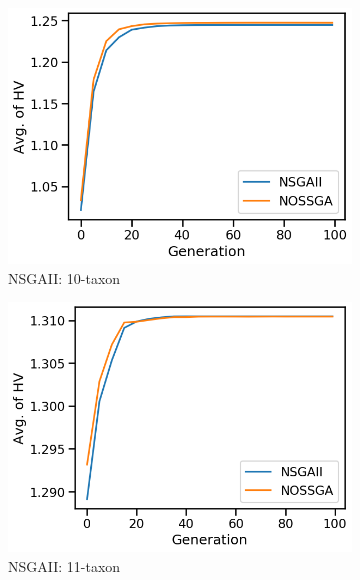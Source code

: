 \begin{figure}[!htbp]
	\centering
	\begin{adjustwidth}{-1cm}{-1cm}
		\begin{subfigure}[b]{0.4\textwidth}
			\includegraphics[width=\textwidth]{Figure/10-taxon_hv}
			\caption{NSGAII: 10-taxon}
		\end{subfigure}%
		\begin{subfigure}[b]{0.4\textwidth}
			\includegraphics[width=\textwidth]{Figure/11-taxon_hv}
			\caption{NSGAII: 11-taxon}
		\end{subfigure}%
		\begin{subfigure}[b]{0.4\textwidth}

\end{subfigure}
\end{adjustwidth}
\end{figure}
